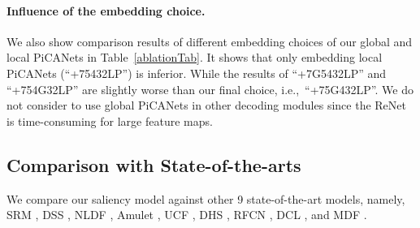 \documentclass[10pt,twocolumn,letterpaper]{article}
\def\ie{i.e.,~} %
\begin{document}
\paragraph{Influence of the embedding choice.} We also show comparison results of different embedding choices of our global and local PiCANets in Table~\ref{ablationTab}. It shows that only embedding local PiCANets (``+75432LP'') is inferior. While the results of ``+7G5432LP'' and ``+754G32LP'' are slightly worse than our final choice, \ie ``+75G432LP''. We do not consider to use global PiCANets in other decoding modules since the ReNet is time-consuming for large feature maps.
\subsection{Comparison with State-of-the-arts}

We compare our saliency model against other 9 state-of-the-art models, namely, SRM \cite{Wang2017srm}, DSS \cite{hou2017dss}, NLDF \cite{luo2017nldf}, Amulet \cite{Zhang2017amulet}, UCF \cite{Zhang2017ucf}, DHS \cite{liu2016dhsnet}, RFCN \cite{wang2016rfcn}, DCL \cite{li2016dcl}, and MDF \cite{li2015mdf}.
\end{document}
